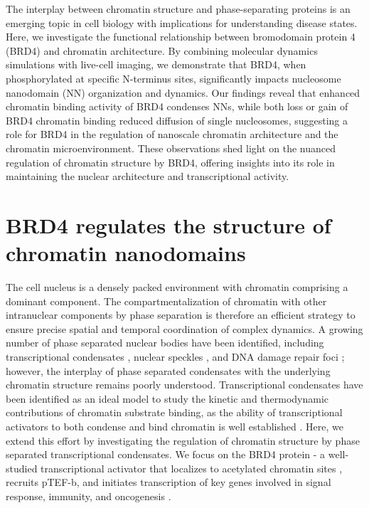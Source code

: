 The interplay between chromatin structure and phase-separating proteins is an emerging topic in cell biology with implications for understanding disease states. Here, we investigate the functional relationship between bromodomain protein 4 (BRD4) and chromatin architecture. By combining molecular dynamics simulations with live-cell imaging, we demonstrate that BRD4, when phosphorylated at specific N-terminus sites, significantly impacts nucleosome nanodomain (NN) organization and dynamics. Our findings reveal that enhanced chromatin binding activity of BRD4 condenses NNs, while both loss or gain of BRD4 chromatin binding reduced diffusion of single nucleosomes, suggesting a role for BRD4 in the regulation of nanoscale chromatin architecture and the chromatin microenvironment. These observations shed light on the nuanced regulation of chromatin structure by BRD4, offering insights into its role in maintaining the nuclear architecture and transcriptional activity.

\section{BRD4 regulates the structure of chromatin nanodomains}

The cell nucleus is a densely packed environment with chromatin comprising a dominant component. The compartmentalization of chromatin with other intranuclear components by phase separation is therefore an efficient strategy to ensure precise spatial and temporal coordination of complex dynamics. A growing number of phase separated nuclear bodies have been identified, including transcriptional condensates \parencite{Sabari2018,Hnisz2017}, nuclear speckles \parencite{Brown2008}, and DNA damage repair foci \parencite{Wang2023}; however, the interplay of phase separated condensates with the underlying chromatin structure remains poorly understood. Transcriptional condensates have been identified as an ideal model to study the kinetic and thermodynamic contributions of chromatin substrate binding, as the ability of transcriptional activators to both condense and bind chromatin is well established \parencite{Sabari2018,Wagh2021,Plys2018,Strom2024,Ma2021}. Here, we extend this effort by investigating the regulation of chromatin structure by phase separated transcriptional condensates. We focus on the BRD4 protein - a well-studied transcriptional activator that localizes to acetylated chromatin sites \parencite{Wu2018}, recruits pTEF-b, and initiates transcription of key genes involved in signal response, immunity, and oncogenesis \parencite{Itzen2014}.

